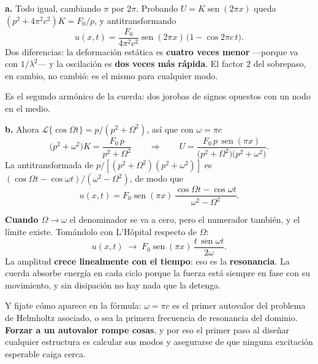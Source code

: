 \documentclass[
  spanish,
  a4paper,
]{scrbook}
\theoremstyle{definition}
\theoremstyle{plain}
\theoremstyle{definition}
\theoremstyle{plain}
\theoremstyle{definition}
\theoremstyle{remark}
\begin{document}
\begin{tcolorbox}[enhanced jigsaw, arc=.35mm, bottomrule=.15mm, bottomtitle=1mm, breakable, colback=white, colbacktitle=quarto-callout-tip-color!10!white, colframe=quarto-callout-tip-color-frame, coltitle=black, left=2mm, leftrule=.75mm, opacityback=0, opacitybacktitle=0.6, rightrule=.15mm, title=\textcolor{quarto-callout-tip-color}{\faLightbulb}\hspace{0.5em}{Solución}, titlerule=0mm, toprule=.15mm, toptitle=1mm]

\textbf{a.} Todo igual, cambiando \(\pi\) por \(2\pi\). Probando
\(U = K\operatorname{sen}(2\pi x)\) queda \((p^2+4\pi^2c^2)K = F_0/p\),
y antitransformando \[
u(x,t) = \frac{F_0}{4\pi^2c^2}\operatorname{sen}(2\pi x)\,\big(1-\cos 2\pi c\,t\big).
\] Dos diferencias: la deformación estática es \textbf{cuatro veces
menor} ---porque va con \(1/\lambda^2\)--- y la oscilación es
\textbf{dos veces más rápida}. El factor \(2\) del sobrepaso, en cambio,
no cambió: es el mismo para cualquier modo.

Es el segundo armónico de la cuerda: dos jorobas de signos opuestos con
un nodo en el medio.

\textbf{b.} Ahora \(\mathcal{L}\{\cos\Omega t\} = p/(p^2+\Omega^2)\),
así que con \(\omega = \pi c\) \[
\big(p^2+\omega^2\big)K = \frac{F_0\,p}{p^2+\Omega^2}
\qquad\Longrightarrow\qquad
U = \frac{F_0\,p\,\operatorname{sen}(\pi x)}{\big(p^2+\Omega^2\big)\big(p^2+\omega^2\big)} .
\] La antitransformada de \(p/[(p^2+\Omega^2)(p^2+\omega^2)]\) es
\((\cos\Omega t - \cos\omega t)/(\omega^2-\Omega^2)\), de modo que \[
u(x,t) = F_0\operatorname{sen}(\pi x)\,\frac{\cos\Omega t - \cos\omega t}{\omega^2-\Omega^2} .
\]

\textbf{Cuando \(\Omega \to \omega\)} el denominador se va a cero, pero
el numerador también, y el límite existe. Tomándolo con L'Hôpital
respecto de \(\Omega\): \[
u(x,t) \;\longrightarrow\; F_0\operatorname{sen}(\pi x)\,\frac{t\,\operatorname{sen}\omega t}{2\omega} .
\] La amplitud \textbf{crece linealmente con el tiempo}: eso es la
\textbf{resonancia}. La cuerda absorbe energía en cada ciclo porque la
fuerza está siempre en fase con su movimiento, y sin disipación no hay
nada que la detenga.

Y fijate cómo aparece en la fórmula: \(\omega = \pi c\) es el primer
autovalor del problema de Helmholtz asociado, o sea la primera
frecuencia de resonancia del dominio. \textbf{Forzar a un autovalor
rompe cosas}, y por eso el primer paso al diseñar cualquier estructura
es calcular sus modos y asegurarse de que ninguna excitación esperable
caiga cerca.

\end{tcolorbox}
\end{document}
